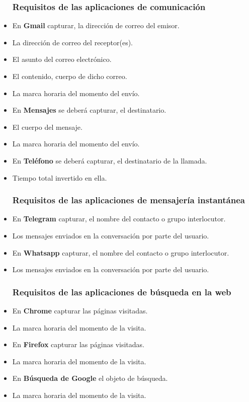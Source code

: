 \documentclass[12pt,a4paper,oneside]{book} %
\begin{document}
\begin{itemize}
\subsubsection{Requisitos de las aplicaciones de comunicación}
  \item En  \textbf{Gmail} capturar, la dirección de correo del emisor. 
  \item La dirección de correo del receptor(es). 
  \item El asunto del correo electrónico. 
  \item El contenido, cuerpo de dicho correo. 
  \item La marca horaria del momento del envío. 
  \item En \textbf{Mensajes} se deberá capturar, el destinatario. 
  \item El cuerpo del mensaje. 
  \item La marca horaria del momento del envío. 
  \item En \textbf{Teléfono} se deberá capturar, el destinatario de la llamada. 
  \item Tiempo total invertido en ella. 
\subsubsection{Requisitos de las aplicaciones de mensajería instantánea}
  \item En \textbf{Telegram} capturar, el nombre del contacto o grupo interlocutor. 
  \item Los mensajes enviados en la conversación por parte del usuario. 
  \item En \textbf{Whatsapp} capturar, el nombre del contacto o grupo interlocutor. 
  \item Los mensajes enviados en la conversación por parte del usuario. 
\subsubsection{Requisitos de las aplicaciones de búsqueda en la web}
  \item En \textbf{Chrome} capturar las páginas visitadas. 
  \item La marca horaria del momento de la visita. 
  \item En \textbf{Firefox} capturar las páginas visitadas. 
  \item La marca horaria del momento de la visita. 
  \item En \textbf{Búsqueda de Google} el objeto de búsqueda. 
  \item La marca horaria del momento de la visita. 

\end{itemize}
\end{document}
